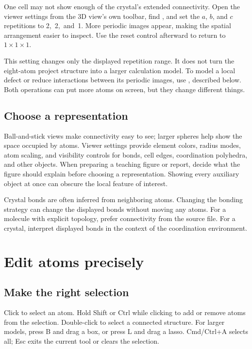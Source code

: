 One cell may not show enough of the crystal's extended connectivity. Open the viewer settings from the 3D view's own toolbar, find , and set the $a$, $b$, and $c$ repetitions to \mbox{2, 2, and 1}. More periodic images appear, making the spatial arrangement easier to inspect. Use the reset control afterward to return to $1\times1\times1$.

This setting changes only the displayed repetition range. It does not turn the eight-atom project structure into a larger calculation model. To model a local defect or reduce interactions between its periodic images, use , described below. Both operations can put more atoms on screen, but they change different things.

\subsection{Choose a representation}

Ball-and-stick views make connectivity easy to see; larger spheres help show the space occupied by atoms. Viewer settings provide element colors, radius modes, atom scaling, and visibility controls for bonds, cell edges, coordination polyhedra, and other objects. When preparing a teaching figure or report, decide what the figure should explain before choosing a representation. Showing every auxiliary object at once can obscure the local feature of interest.

Crystal bonds are often inferred from neighboring atoms. Changing the bonding strategy can change the displayed bonds without moving any atoms. For a molecule with explicit topology, prefer connectivity from the source file. For a crystal, interpret displayed bonds in the context of the coordination environment.

\section{Edit atoms precisely}

\subsection{Make the right selection}

Click to select an atom. Hold Shift or Ctrl while clicking to add or remove atoms from the selection. Double-click to select a connected structure. For larger models, press B and drag a box, or press L and drag a lasso. Cmd/Ctrl+A selects all; Esc exits the current tool or clears the selection.

